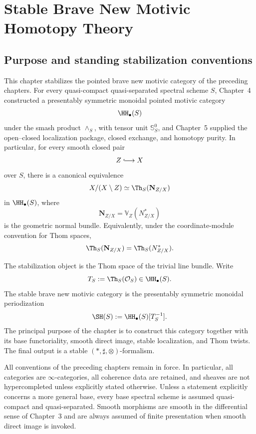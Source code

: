 \chapter{Stable Brave New Motivic Homotopy Theory}
\label{chap:stable-brave-new-motivic}

\section{Purpose and standing stabilization conventions}
\label{sec:stable-purpose}

This chapter stabilizes the pointed brave new motivic category of the
preceding chapters.  For every quasi-compact quasi-separated spectral scheme
\(S\), Chapter~4 constructed a presentably symmetric monoidal pointed
motivic category
\[
    \HH_\bullet(S)
\]
under the smash product \(\wedge_S\), with tensor unit
\(\mathbb S^0_S\), and Chapter~5 supplied the open--closed localization
package, closed exchange, and homotopy purity.  In particular, for every
smooth closed pair
\[
    Z\lhook\joinrel\longrightarrow X
\]
over \(S\), there is a canonical equivalence
\[
    X/(X\setminus Z)
    \simeq
    \Th_S(\mathbf N_{Z/X})
\]
in \(\HH_\bullet(S)\), where
\[
    \mathbf N_{Z/X}
    =
    \mathbb V_Z(N^*_{Z/X})
\]
is the geometric normal bundle.  Equivalently, under the coordinate-module
convention for Thom spaces,
\[
    \Th_S(\mathbf N_{Z/X})
    =
    \Th_S(N^*_{Z/X}).
\]

The stabilization object is the Thom space of the trivial line bundle.  Write
\[
    T_S
    :=
    \Th_S(\mathcal O_S)
    \in
    \HH_\bullet(S).
\]
The stable brave new motivic category is the presentably symmetric monoidal periodization
\[
    \SH(S)
    :=
    \HH_\bullet(S)[T_S^{-1}].
\]
The principal purpose of the chapter is to construct this category together with its base
functoriality, smooth direct image, stable localization, and Thom twists.  The final output is a stable
$(\ast,\sharp,\otimes)$-formalism.

All conventions of the preceding chapters remain in force.  In particular, all categories are
$\infty$-categories, all coherence data are retained, and sheaves are not hypercompleted unless
explicitly stated otherwise.  Unless a statement explicitly concerns a more general base, every base
spectral scheme is assumed quasi-compact and quasi-separated.  Smooth morphisms are smooth in the
differential sense of Chapter~3 and are always assumed of finite presentation when smooth direct
image is invoked.

